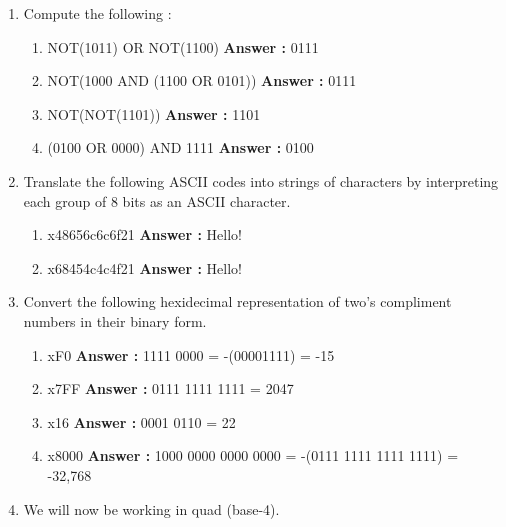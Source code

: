 \documentclass[a4paper,11pt]{article}
\begin{document}
\begin{enumerate}
\item Compute the following :

  \begin{enumerate}
  \item NOT(1011) OR NOT(1100)  \textbf{Answer :} 0111  
  \item NOT(1000 AND (1100 OR 0101))  \textbf{Answer :}   0111
  \item  NOT(NOT(1101)) \textbf{Answer :}   1101
  \item  (0100 OR 0000) AND 1111 \textbf{Answer :}  0100
  \end{enumerate}

\item Translate the following ASCII codes into strings of characters by interpreting each group of 8 bits as an ASCII character.

  
  \begin{enumerate}
  \item x48656c6c6f21  \textbf{Answer :}    Hello!
  \item  x68454c4c4f21 \textbf{Answer :}    Hello!
  \end{enumerate}


\item Convert the following hexidecimal representation of two's compliment numbers in their binary form.
  
  \begin{enumerate}
  \item xF0  \textbf{Answer :}    1111 0000 = -(00001111) = -15
  \item x7FF \textbf{Answer :}    0111 1111 1111 = 2047
  \item x16  \textbf{Answer :}    0001 0110 = 22
  \item x8000  \textbf{Answer :}    1000 0000 0000 0000 = -(0111 1111 1111 1111) = -32,768
  \end{enumerate}

\item We will now be working in quad (base-4). 


\end{enumerate}
\end{document}
